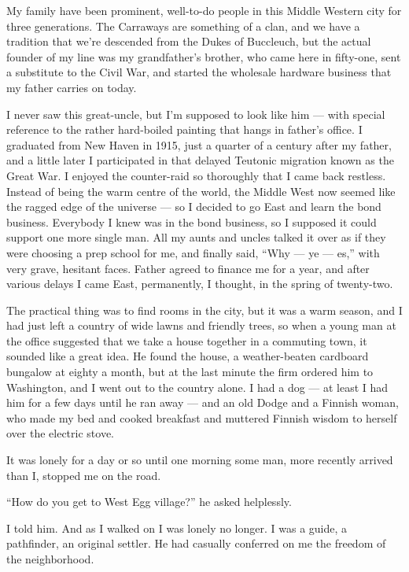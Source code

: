 \documentclass{znotebook}
\begin{document}
My family have been prominent, well-to-do people in this Middle Western city for three generations. The Carraways are something of a clan, and we have a tradition that we're descended from the Dukes of Buccleuch, but the actual founder of my line was my grandfather's brother, who came here in fifty-one, sent a substitute to the Civil War, and started the wholesale hardware business that my father carries on today.

I never saw this great-uncle, but I'm supposed to look like him ---{} with special reference to the rather hard-boiled painting that hangs in father's office. I graduated from New Haven in 1915, just a quarter of a century after my father, and a little later I participated in that delayed Teutonic migration known as the Great War. I enjoyed the counter-raid so thoroughly that I came back restless. Instead of being the warm centre of the world, the Middle West now seemed like the ragged edge of the universe ---{} so I decided to go East and learn the bond business. Everybody I knew was in the bond business, so I supposed it could support one more single man. All my aunts and uncles talked it over as if they were choosing a prep school for me, and finally said, ``Why ---{} ye ---{} es,'' with very grave, hesitant faces. Father agreed to finance me for a year, and after various delays I came East, permanently, I thought, in the spring of twenty-two.

The practical thing was to find rooms in the city, but it was a warm season, and I had just left a country of wide lawns and friendly trees, so when a young man at the office suggested that we take a house together in a commuting town, it sounded like a great idea. He found the house, a weather-beaten cardboard bungalow at eighty a month, but at the last minute the firm ordered him to Washington, and I went out to the country alone. I had a dog ---{} at least I had him for a few days until he ran away ---{} and an old Dodge and a Finnish woman, who made my bed and cooked breakfast and muttered Finnish wisdom to herself over the electric stove.

It was lonely for a day or so until one morning some man, more recently arrived than I, stopped me on the road.

``How do you get to West Egg village?'' he asked helplessly.

I told him. And as I walked on I was lonely no longer. I was a guide, a pathfinder, an original settler. He had casually conferred on me the freedom of the neighborhood.
\end{document}
